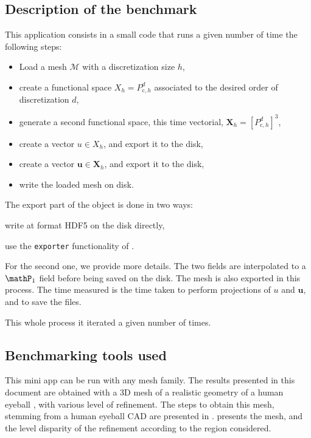 

\subsection{Description of the benchmark}

This application consists in a small code that runs a given number of time the following steps:
\begin{itemize}
    \item Load a mesh $\mathcal{M}$ with a discretization size $h$,
    \item create a functional space $X_h = P_{\text{c},h}^d$ associated to the desired order of discretization $d$,
    \item generate a second functional space, this time vectorial, $\mathbf{X}_h = \left[P_{\text{c},h}^d\right]^3$,
    \item create a vector $u\in X_h$, and export it to the disk,
    \item create a vector $\mathbf{u}\in\mathbf{X}_h$, and export it to the disk,
    \item write the loaded mesh on disk.
\end{itemize}

The export part of the object is done in two ways:
\begin{inparaenum}[\it (i)]
  \item write at format HDF5 on the disk directly,
  \item use the \texttt{exporter} functionality of \Feelpp.
\end{inparaenum}
For the second one, we provide more details.
The two fields are interpolated to a $\mathP_1$ field before being saved on the disk.
The mesh is also exported in this process.
The time measured is the time taken to perform projections of $u$ and $\mathbf{u}$, and to save the files.

This whole process it iterated a given number of times.



\subsection{Benchmarking tools used}

This mini app can be run with any mesh family.
The results presented in this document are obtained with a 3D mesh of a realistic geometry of a human eyeball \cite{saigre_model_2024}, with various level of refinement.
The steps to obtain this mesh, stemming from a human eyeball CAD are presented in \cite{chabannes_3d_2024}.
 presents the mesh, and the level disparity of the refinement according to the region considered.

